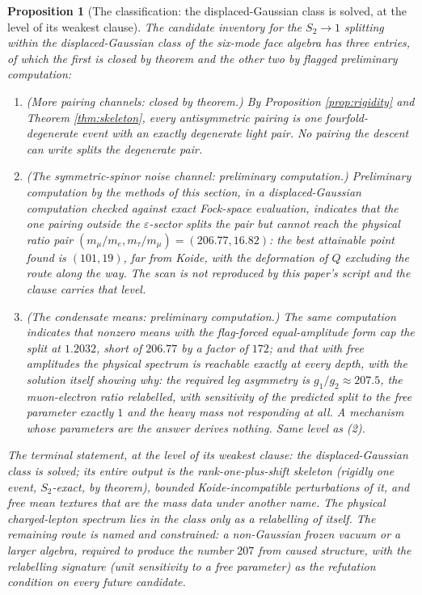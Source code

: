 \documentclass[11pt]{article}
\newtheorem{proposition}[theorem]{Proposition}
\theoremstyle{definition}
\begin{document}
\begin{proposition}[The classification: the displaced-Gaussian class is solved, at the level of its weakest clause]\label{prop:classification}
The candidate inventory for the $S_{2} \to 1$ splitting within the displaced-Gaussian class of the six-mode face algebra has three entries, of which the first is closed by theorem and the other two by flagged preliminary computation:
\begin{enumerate}
\item \emph{(More pairing channels: closed by theorem.)} By Proposition \ref{prop:rigidity} and Theorem \ref{thm:skeleton}, every antisymmetric pairing is one fourfold-degenerate event with an exactly degenerate light pair. No pairing the descent can write splits the degenerate pair.
\item \emph{(The symmetric-spinor noise channel: preliminary computation.)} Preliminary computation by the methods of this section, in a displaced-Gaussian computation checked against exact Fock-space evaluation, indicates that the one pairing outside the $\varepsilon$-sector splits the pair but cannot reach the physical ratio pair $(m_{\mu}/m_{e}, m_{\tau}/m_{\mu}) = (206.77, 16.82)$: the best attainable point found is $(101, 19)$, far from Koide, with the deformation of $Q$ excluding the route along the way. The scan is not reproduced by this paper's script and the clause carries that level.
\item \emph{(The condensate means: preliminary computation.)} The same computation indicates that nonzero means with the flag-forced equal-amplitude form cap the split at $1.2032$, short of $206.77$ by a factor of $172$; and that with free amplitudes the physical spectrum is reachable exactly at every depth, with the solution itself showing why: the required leg asymmetry is $g_{1}/g_{2} \approx 207.5$, the muon-electron ratio relabelled, with sensitivity of the predicted split to the free parameter exactly $1$ and the heavy mass not responding at all. A mechanism whose parameters are the answer derives nothing. Same level as (2).
\end{enumerate}
The terminal statement, at the level of its weakest clause: the displaced-Gaussian class is solved; its entire output is the rank-one-plus-shift skeleton (rigidly one event, $S_{2}$-exact, by theorem), bounded Koide-incompatible perturbations of it, and free mean textures that are the mass data under another name. The physical charged-lepton spectrum lies in the class only as a relabelling of itself. The remaining route is named and constrained: a non-Gaussian frozen vacuum or a larger algebra, required to produce the number $207$ from caused structure, with the relabelling signature (unit sensitivity to a free parameter) as the refutation condition on every future candidate.
\end{proposition}
\end{document}

